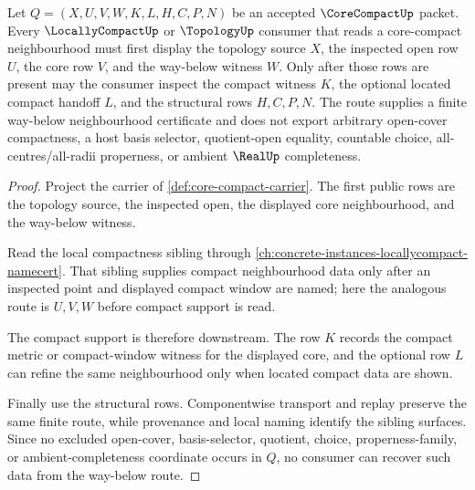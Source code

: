 \begin{theorem}
\label{thm:core-compact-way-below-neighbourhood-route}
Let $Q=(X,U,V,W,K,L,H,C,P,N)$ be an accepted $\CoreCompactUp$ packet. Every $\LocallyCompactUp$ or $\TopologyUp$ consumer that reads a core-compact neighbourhood must first display the topology source $X$, the inspected open row $U$, the core row $V$, and the way-below witness $W$. Only after those rows are present may the consumer inspect the compact witness $K$, the optional located compact handoff $L$, and the structural rows $H,C,P,N$. The route supplies a finite way-below neighbourhood certificate and does not export arbitrary open-cover compactness, a host basis selector, quotient-open equality, countable choice, all-centres/all-radii properness, or ambient $\RealUp$ completeness.
\end{theorem}
\begin{proof}
Project the carrier of \autoref{def:core-compact-carrier}. The first public rows are the topology source, the inspected open, the displayed core neighbourhood, and the way-below witness.

Read the local compactness sibling through \autoref{ch:concrete-instances-locallycompact-namecert}. That sibling supplies compact neighbourhood data only after an inspected point and displayed compact window are named; here the analogous route is $U,V,W$ before compact support is read.

The compact support is therefore downstream. The row $K$ records the compact metric or compact-window witness for the displayed core, and the optional row $L$ can refine the same neighbourhood only when located compact data are shown.

Finally use the structural rows. Componentwise transport and replay preserve the same finite route, while provenance and local naming identify the sibling surfaces. Since no excluded open-cover, basis-selector, quotient, choice, properness-family, or ambient-completeness coordinate occurs in $Q$, no consumer can recover such data from the way-below route.
\end{proof}

